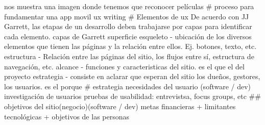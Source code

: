 nos muestra una imagen donde tenemos que reconocer películas
# proceso para fundamentar una app movil
ux writing
# Elementos de ux
De acuerdo con JJ Garrett, las etapas de un desarrollo deben trabajarse por capas para identificar cada elemento.
capas de Garrett
superficie
esqueleto - ubicación de los diversos elementos que tienen las páginas y la relación entre ellos. Ej. botones, texto, etc.
estructura - Relación entre las páginas del sitio, los flujos entre sí, estructura de navegación, etc.
alcance - funciones y caracteristicas del sitio. es el que el del proyecto
estrategia - consiste en aclarar que esperan del sitio los dueños, gestores, los usuarios. es el porque
# estrategia
necesidades del usuario (software / dev)
investigación de usuarios
pruebas de usabilidad: entrevistsa, focus groups, etc
## objetivos del sitio(negocio)(software / dev)
metas financieras + limitantes tecnológicas + objetivos de las personas
